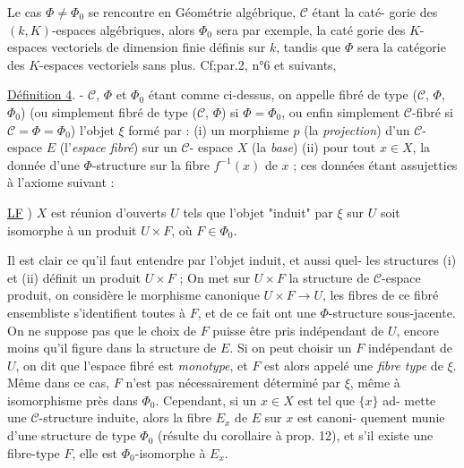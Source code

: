 \newpage



Le cas $\Phi \neq \Phi_0$ se rencontre en Géométrie algébrique, $\mathcal{C}$ étant la caté-
gorie des $(k,K)$-espaces algébriques, alors $\Phi_0$ sera par exemple, la caté
gorie des $K$-espaces vectoriels de dimension finie définis sur $k$, tandis
que $\Phi$ sera la catégorie des $K$-espaces vectoriels sans plus. Cf;par.2,
n°6 et suivants,

\underline{Définition 4}. - $\mathcal{C}$, $\Phi$ et $\Phi_0$ étant comme ci-dessus, on appelle fibré de
type ($\mathcal{C}$, $\Phi$, $\Phi_0$) (ou simplement fibré de type ($\mathcal{C}$, $\Phi$) si $\Phi = \Phi_0$, ou
enfin simplement $\mathcal{C}$-fibré si $\mathcal{C} = \Phi = \Phi_0$) l'objet $\xi$ formé par : (i) un
morphisme $p$ (la \emph{projection}) d'un $\mathcal{C}$-espace $E$ (l'\emph{espace fibré}) sur un $\mathcal{C}$-
espace $X$ (la \emph{base}) (ii) pour tout $x \in X$, la donnée d'une $\Phi$-structure sur
la fibre $f^{-1}(x)$ de $x$ ; ces données étant assujetties à l'axiome suivant :

\underline{LF} ) $X$ est réunion d'ouverts $U$ tels que l'objet "induit" par $\xi$ sur $U$
soit isomorphe à un produit $U \times F$, où $F \in \Phi_0$.

Il est clair ce qu'il faut entendre par l'objet induit, et aussi quel-
les structures (i) et (ii) définit un produit $U \times F$ ; On met sur $U \times F$ la
structure de $\mathcal{C}$-espace produit, on considère le morphisme canonique
$U \times F \to U$, les fibres de ce fibré ensembliste s'identifient toutes à $F$, et
de ce fait ont une $\Phi$-structure sous-jacente. On ne suppose pas que le
choix de $F$ puisse être pris indépendant de $U$, encore moins qu'il figure
dans la structure de $E$. Si on peut choisir un $F$ indépendant de $U$, on dit
que l'espace fibré est \emph{monotype}, et $F$ est alors appelé une \emph{fibre type} de
$\xi$. Même dans ce cas, $F$ n'est pas nécessairement déterminé par $\xi$, même
à isomorphisme près dans $\Phi_0$. Cependant, si un $x \in X$ est tel que $\{x\}$ ad-
mette une $\mathcal{C}$-structure induite, alors la fibre $E_x$ de $E$ sur $x$ est canoni-
quement munie d'une structure de type $\Phi_0$ (résulte du corollaire à prop.
12), et s'il existe une fibre-type $F$, elle est $\Phi_0$-isomorphe à $E_x$.

\newpage


